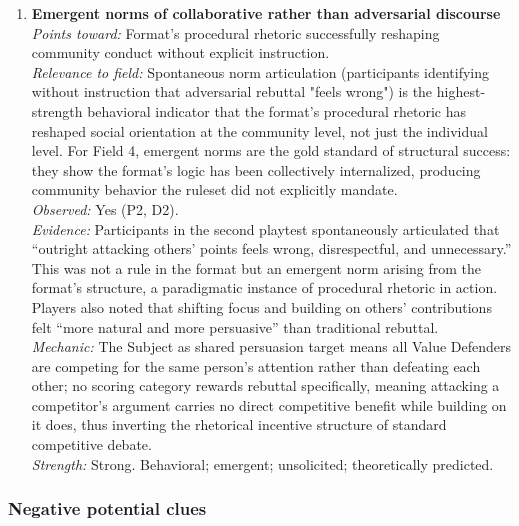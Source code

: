 \documentclass[12pt]{article}
\begin{document}
\begin{enumerate}
\item \textbf{Emergent norms of collaborative rather than adversarial discourse}\\
\textit{Points toward:} Format's procedural rhetoric successfully reshaping community conduct without explicit instruction.\\
\textit{Relevance to field:} Spontaneous norm articulation (participants identifying without instruction that adversarial rebuttal "feels wrong") is the highest-strength behavioral indicator that the format's procedural rhetoric has reshaped social orientation at the community level, not just the individual level. For Field 4, emergent norms are the gold standard of structural success: they show the format's logic has been collectively internalized, producing community behavior the ruleset did not explicitly mandate.\\
\textit{Observed:} Yes (P2, D2).\\
\textit{Evidence:} Participants in the second playtest spontaneously articulated that ``outright attacking others' points feels wrong, disrespectful, and unnecessary.'' This was not a rule in the format but an emergent norm arising from the format's structure, a paradigmatic instance of procedural rhetoric in action. Players also noted that shifting focus and building on others' contributions felt ``more natural and more persuasive'' than traditional rebuttal.\\
\textit{Mechanic:} The Subject as shared persuasion target means all Value Defenders are competing for the same person's attention rather than defeating each other; no scoring category rewards rebuttal specifically, meaning attacking a competitor's argument carries no direct competitive benefit while building on it does, thus inverting the rhetorical incentive structure of standard competitive debate.\\
\textit{Strength:} Strong. Behavioral; emergent; unsolicited; theoretically predicted.

\end{enumerate}

\subsubsection*{Negative potential clues}
\end{document}
